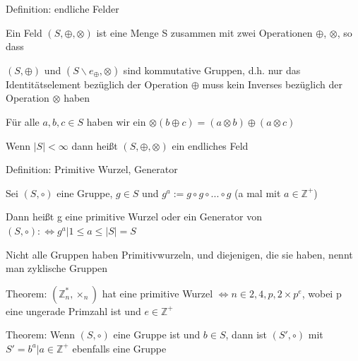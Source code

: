 \documentclass[a4paper]{article}
\begin{document}
\begin{multicols}{3}
\begin{itemize*}
            \item Definition: endliche Felder
            \begin{itemize*}
                  \item Ein Feld $(S,\oplus, \otimes)$ ist eine Menge S zusammen mit zwei Operationen $\oplus$, $\otimes$, so dass
                  \item $(S,\oplus)$ und $(S\backslash{e_{\oplus}},\otimes)$ sind kommutative Gruppen, d.h. nur das Identitätselement bezüglich der Operation $\oplus$ muss kein Inverses bezüglich der Operation $\otimes$ haben
                  \item Für alle $a,b,c\in S$ haben wir ein $\otimes(b\oplus c)=(a\otimes b)\oplus(a\otimes c)$
            \end{itemize*}
            \item Wenn $| S|<\infty$ dann heißt $(S,\oplus,\otimes)$ ein endliches Feld
            \item Definition: Primitive Wurzel, Generator
            \begin{itemize*}
                  \item Sei $(S,\circ)$ eine Gruppe, $g\in S$ und $g^a:=g\circ g\circ...\circ g$ (a mal mit $a\in\mathbb{Z}^+$)
                  \item Dann heißt g eine primitive Wurzel oder ein Generator von $(S,\circ):\Leftrightarrow{g^a|1\leq a\leq | S|}=S$
                  \item Nicht alle Gruppen haben Primitivwurzeln, und diejenigen, die sie haben, nennt man zyklische Gruppen
            \end{itemize*}
            \item Theorem: $(\mathbb{Z}^*_n, \times_n)$ hat eine primitive Wurzel $\Leftrightarrow n\in{2,4,p,2\times p^e}$, wobei p eine ungerade Primzahl ist und $e\in\mathbb{Z}^+$
            \item Theorem: Wenn $(S,\circ)$ eine Gruppe ist und $b\in S$, dann ist $(S',\circ)$ mit $S'={b^a| a\in\mathbb{Z}^+}$ ebenfalls eine Gruppe

\end{itemize*}
\end{multicols}
\end{document}
